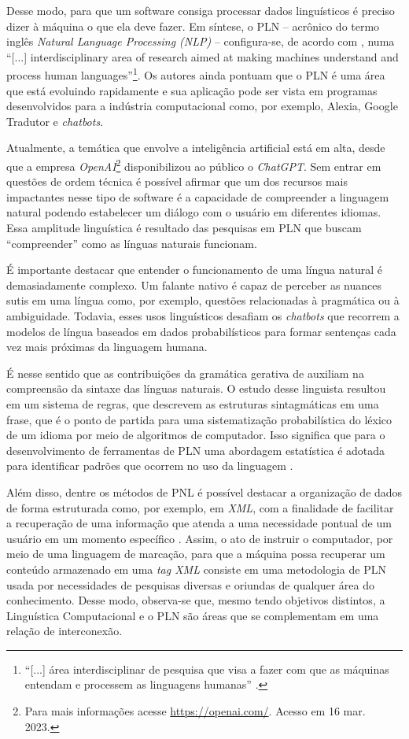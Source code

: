 \documentclass[portuguese]{textolivre}
\begin{document}
Desse modo, para que um software consiga processar dados linguísticos é preciso dizer à máquina o que ela deve fazer. Em síntese, o PLN – acrônico do termo inglês \emph{Natural Language Processing (NLP)} – configura-se, de acordo com \textcite[p.~7, tradução nossa]{kedia2020hands}, numa “[...] interdisciplinary area of research aimed at making machines understand and process human languages”\footnote{“[...] área interdisciplinar de pesquisa que visa a fazer com que as máquinas entendam e processem as
linguagens humanas” \cite[p. 7]{kedia2020hands}.}. Os autores ainda pontuam que o PLN é uma área que está evoluindo rapidamente e sua aplicação pode ser vista em programas desenvolvidos para a indústria computacional como, por exemplo, Alexia, Google Tradutor e \emph{chatbots}.

Atualmente, a temática que envolve a inteligência artificial está em alta, desde que a empresa \emph{OpenAI}\footnote{Para mais informações acesse \url{https://openai.com/}. Acesso em 16 mar. 2023.} disponibilizou ao público o \emph{ChatGPT}. Sem entrar em questões de ordem técnica é possível afirmar que um dos recursos mais impactantes nesse tipo de software é a capacidade de compreender a linguagem natural podendo estabelecer um diálogo com o usuário em diferentes idiomas. Essa amplitude linguística é resultado das pesquisas em PLN que buscam “compreender” como as línguas naturais funcionam.

É importante destacar que entender o funcionamento de uma língua natural é demasiadamente complexo. Um falante nativo é capaz de perceber as nuances sutis em uma língua como, por exemplo, questões relacionadas à pragmática ou à ambiguidade. Todavia, esses usos linguísticos desafiam os \emph{chatbots} que recorrem a modelos de língua baseados em dados probabilísticos para formar sentenças cada vez mais próximas da linguagem humana.

É nesse sentido que as contribuições da gramática gerativa de \textcite[p. 15]{chomsky1965} auxiliam na compreensão da sintaxe das línguas naturais. O estudo desse linguista resultou em um sistema de regras, que descrevem as estruturas sintagmáticas em uma frase, que é o ponto de partida para uma sistematização probabilística do léxico de um idioma por meio de algoritmos de computador. Isso significa que para o desenvolvimento de ferramentas de PLN uma abordagem estatística é adotada para identificar padrões que ocorrem no uso da linguagem \cite[p. 4]{manning1999foundations}.

Além disso, dentre os métodos de PNL é possível destacar a organização de dados de forma estruturada como, por exemplo, em \emph{XML}, com a finalidade de facilitar a recuperação de uma informação que atenda a uma necessidade pontual de um usuário em um momento específico \cite[p. 184]{manning2008introduction}. Assim, o ato de instruir o computador, por meio de uma linguagem de marcação, para que a máquina possa recuperar um conteúdo armazenado em uma \emph{tag XML} consiste em uma metodologia de PLN usada por necessidades de pesquisas diversas e oriundas de qualquer área do conhecimento. Desse modo, observa-se que, mesmo tendo objetivos  distintos, a Linguística Computacional e o PLN são áreas que se complementam em uma relação de interconexão. 
\end{document}
